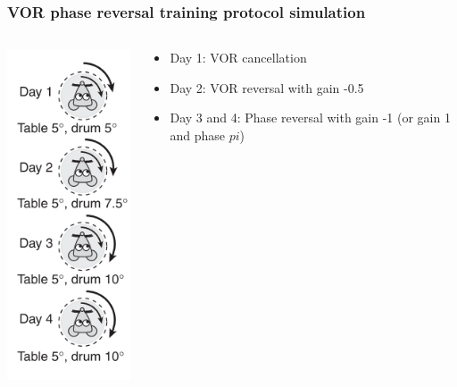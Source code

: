 \documentclass[10pt, compress]{beamer}
\begin{document}
\begin{frame}[fragile]
  \frametitle{VOR phase reversal training protocol simulation}
  \begin{columns}[T]
    \begin{column}[T]{5cm}
      \includegraphics[scale=0.4]{images/vvor.png}
    \end{column}
    \begin{column}[T]{5cm}
      \begin{itemize}
        \item Day 1: VOR cancellation
        \item Day 2: VOR reversal with gain -0.5
        \item Day 3 and 4: Phase reversal with gain -1 (or gain 1 and phase $pi$)
      \end{itemize}
    \end{column}
  \end{columns}
\end{frame}
\end{document}
